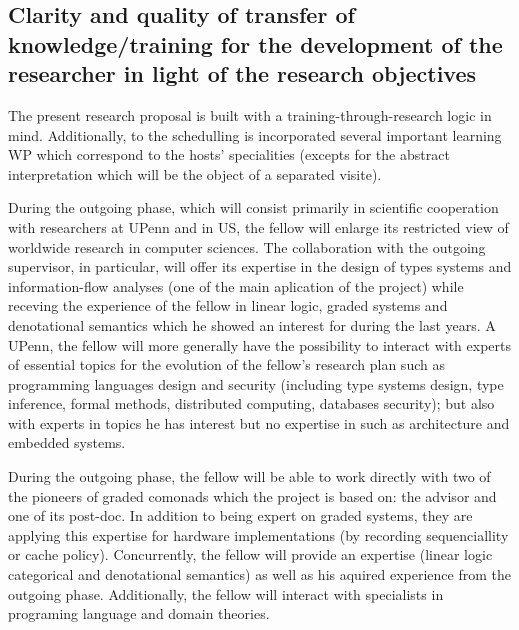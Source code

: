\documentclass{article}[11pt]
\begin{document}
\subsection{Clarity and quality of transfer of knowledge/training for the development of the researcher in light of the research objectives}
The present research proposal is built with a training-through-research logic in mind. Additionally, to the schedulling is incorporated several important learning WP which  correspond to the hosts' specialities (excepts for the abstract interpretation which will be the object of a separated visite).

During the outgoing phase, which will consist primarily in scientific cooperation with researchers at UPenn and in US, the fellow will enlarge its restricted view of worldwide research in computer sciences. The collaboration with the outgoing supervisor, in particular, will offer its expertise in the design of types systems and information-flow analyses (one of the main aplication of the project) while receving the experience of the fellow in linear logic, graded systems and denotational semantics which he showed an interest for during the last years. A UPenn, the fellow will more generally have the possibility to interact with experts of essential topics for the evolution of the fellow’s research plan such as programming languages design and security (including type systems design, type inference, formal methods, distributed computing, databases security); but also with experts in topics he has interest but no expertise in such as architecture and embedded systems.

During the outgoing phase, the fellow will be able to work directly with two of the pioneers of graded comonads which the project is based on: the advisor and one of its post-doc. In addition to being expert on graded systems, they are applying this expertise for hardware implementations (by recording sequenciallity or cache policy). Concurrently, the fellow will provide an expertise (linear logic categorical and denotational semantics) as well as his aquired experience from the outgoing phase. Additionally, the fellow will interact with specialists in programing language and domain theories.

\end{document}
